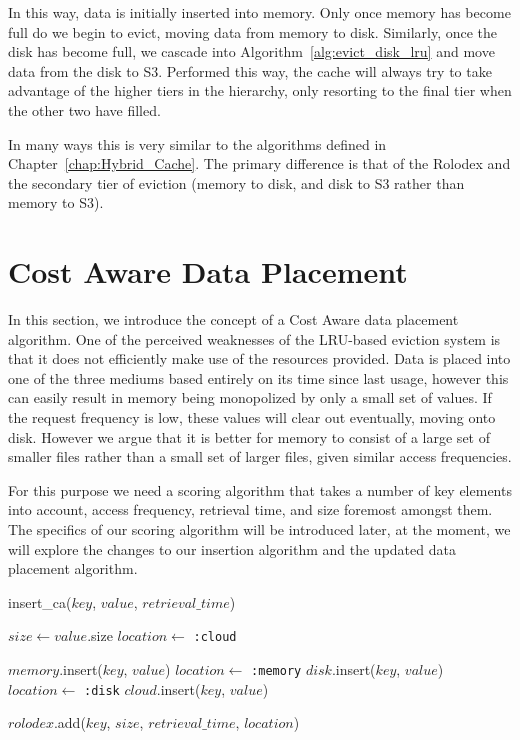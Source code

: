 In this way, data is initially inserted into memory. Only once memory has
become full do we begin to evict, moving data from memory to disk. Similarly,
once the disk has become full, we cascade into
Algorithm~\ref{alg:evict_disk_lru} and move data from the disk to S3. Performed
this way, the cache will always try to take advantage of the higher tiers in the
hierarchy, only resorting to the final tier when the other two have filled.

In many ways this is very similar to the algorithms defined in
Chapter~\ref{chap:Hybrid_Cache}. The primary difference is that of the Rolodex
and the secondary tier of eviction (memory to disk, and disk to S3 rather than
memory to S3).

\section{Cost Aware Data Placement} %
\label{sec:cost-aware}
In this section, we introduce the concept of a Cost Aware data placement
algorithm. One of the perceived weaknesses of the LRU-based eviction system is
that it does not efficiently make use of the resources provided. Data is placed
into one of the three mediums based entirely on its time since last usage,
however this can easily result in memory being monopolized by only a small set
of values. If the request frequency is low, these values will clear out
eventually, moving onto disk. However we argue that it is better for memory to
consist of a large set of smaller files rather than a small set of larger
files, given similar access frequencies.

For this purpose we need a scoring algorithm that takes a number of key
elements into account, access frequency, retrieval time, and size foremost
amongst them. The specifics of our scoring algorithm will be introduced later,
at the moment, we will explore the changes to our insertion algorithm and the
updated data placement algorithm.

\begin{algorithm}[htp]
\small
\caption{\label{alg:insert_ca}insert\_ca($key$, $value$, $retrieval\_time$)}
\begin{algorithmic}[1]
\STATE $size \leftarrow value$.size
\STATE $location \leftarrow$ {\tt :cloud}

  \STATE $memory$.insert($key$, $value$)
	\STATE $location \leftarrow$ {\tt :memory}
	\STATE $disk$.insert($key$, $value$)
	\STATE $location \leftarrow$ {\tt :disk}
\ELSE
	\STATE $cloud$.insert($key$, $value$)
\ENDIF

\STATE $rolodex$.add($key$, $size$, $retrieval\_time$, $location$)
\end{algorithmic}
\end{algorithm}

